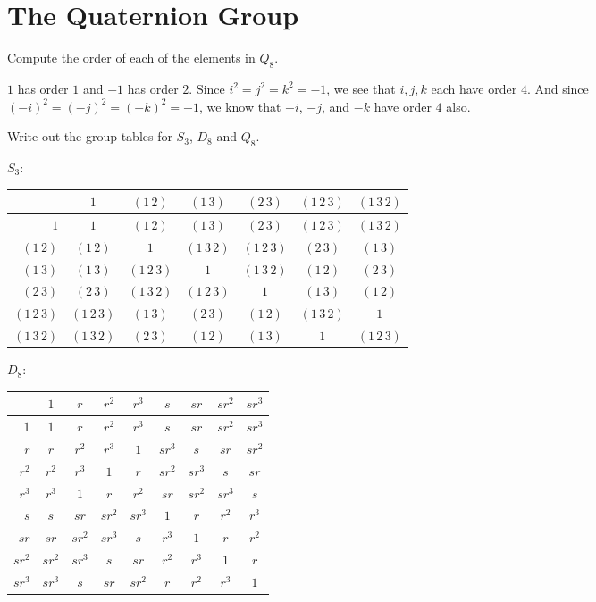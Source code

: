 \section{The Quaternion Group}

 Compute the order of each of the elements in $Q_8$.
\begin{solution}
  $1$ has order $1$ and $-1$ has order $2$. Since
  $i^2 = j^2 = k^2 = -1$, we see that $i,j,k$ each have order $4$. And
  since $(-i)^2 = (-j)^2 = (-k)^2 = -1$, we know that $-i$, $-j$, and
  $-k$ have order $4$ also.
\end{solution}

 Write out the group tables for $S_3$, $D_8$ and $Q_8$.
\begin{solution}
  $S_3$:
  \begin{center}
    \begin{tabular}{r|cccccc}
      & $1$ & $(1\,2)$ & $(1\,3)$ & $(2\,3)$ & $(1\,2\,3)$ & $(1\,3\,2)$ \\
      \hline
      $1$ & $1$ & $(1\,2)$ & $(1\,3)$ & $(2\,3)$ & $(1\,2\,3)$ & $(1\,3\,2)$ \\
      $(1\,2)$ & $(1\,2)$ & $1$ & $(1\,3\,2)$ & $(1\,2\,3)$ & $(2\,3)$
      & $(1\,3)$ \\
      $(1\,3)$ & $(1\,3)$ & $(1\,2\,3)$ & $1$ & $(1\,3\,2)$ & $(1\,2)$
      & $(2\,3)$ \\
      $(2\,3)$ & $(2\,3)$ & $(1\,3\,2)$ & $(1\,2\,3)$ & $1$ & $(1\,3)$
      & $(1\,2)$ \\
      $(1\,2\,3)$ & $(1\,2\,3)$ & $(1\,3)$ & $(2\,3)$ & $(1\,2)$
      & $(1\,3\,2)$ & $1$ \\
      $(1\,3\,2)$ & $(1\,3\,2)$ & $(2\,3)$ & $(1\,2)$ & $(1\,3)$ & $1$
                                                           & $(1\,2\,3)$
    \end{tabular}
  \end{center}

  $D_8$:
  \begin{center}
    \begin{tabular}{r|cccccccc}
      & $1$ & $r$ & $r^2$ & $r^3$ & $s$ & $sr$ & $sr^2$ & $sr^3$ \\
      \hline
      $1$ & $1$ & $r$ & $r^2$ & $r^3$ & $s$ & $sr$ & $sr^2$ & $sr^3$ \\
      $r$ & $r$ & $r^2$ & $r^3$ & $1$ & $sr^3$ & $s$ & $sr$ & $sr^2$ \\
      $r^2$ & $r^2$ & $r^3$ & $1$ & $r$ & $sr^2$ & $sr^3$ & $s$ & $sr$ \\
      $r^3$ & $r^3$ & $1$ & $r$ & $r^2$ & $sr$ & $sr^2$ & $sr^3$ & $s$ \\
      $s$ & $s$ & $sr$ & $sr^2$ & $sr^3$ & $1$ & $r$ & $r^2$ & $r^3$ \\
      $sr$ & $sr$ & $sr^2$ & $sr^3$ & $s$ & $r^3$ & $1$ & $r$ & $r^2$ \\
      $sr^2$ & $sr^2$ & $sr^3$ & $s$ & $sr$ & $r^2$ & $r^3$ & $1$ & $r$ \\
      $sr^3$ & $sr^3$ & $s$ & $sr$ & $sr^2$ & $r$ & $r^2$ & $r^3$ & $1$
    \end{tabular}
  \end{center}


\end{solution}
